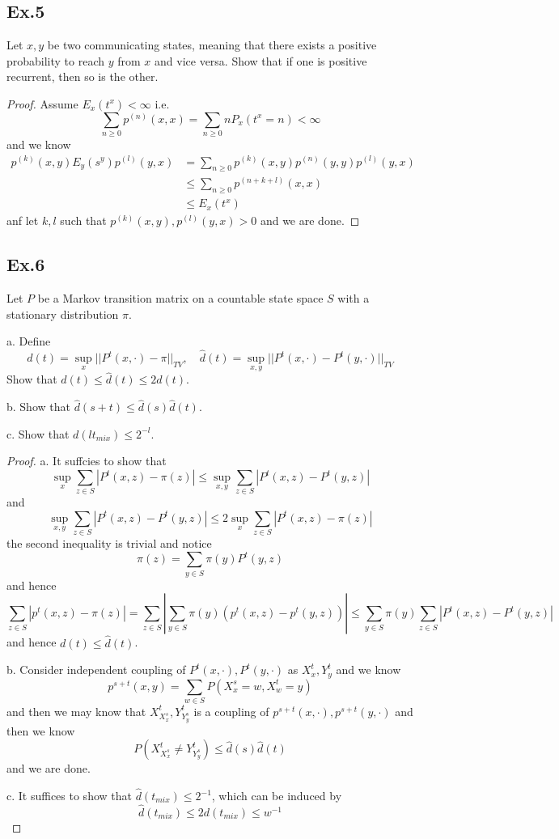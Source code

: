 \documentclass[lang=en,11pt,a4paper,citestyle =authoryear]{elegantpaper}
\begin{document}
\subsection*{Ex.5} 
Let $x,y$ be two communicating states, meaning that there exists a positive probability to reach $y$ from $x$ and vice versa. Show that if one is positive recurrent, then so is the other.
\begin{proof}
    Assume $E_x(t^x) < \infty $ i.e.
    \[
    \sum\limits_{n\geq 0} p^{(n)}(x,x) = \sum\limits_{n\geq 0} nP_x(t^x = n) < \infty
    \]
    and we know
    \[
    \begin{aligned}
    p^{(k)}(x,y)E_y(s^y)p^{(l)}(y,x) &= \sum\limits_{n\geq 0}p^{(k)}(x,y)p^{(n)}(y,y)p^{(l)}(y,x)\\
    & \leq \sum\limits_{n\geq 0}p^{(n+k+l)}(x,x) \\
    & \leq E_x(t^x)
    \end{aligned}
    \]
    anf let $k,l$ such that $p^{(k)}(x,y),p^{(l)}(y,x) > 0$ and we are done.
\end{proof}

\subsection*{Ex.6} 
Let $P$ be a Markov transition matrix on a countable state space $S$ with a stationary distribution $\pi$.\par
a. Define
\[d(t) = \sup_x ||P^t(x,\cdot)-\pi||_{TV},\quad \hat{d}(t) = \sup_{x,y}||P^t(x,\cdot) - P^t(y,\cdot)||_{TV}\]
Show that $d(t) \leq \hat{d}(t) \leq 2d(t)$.\par
b. Show that $\hat{d}(s+t) \leq \hat{d}(s)\hat{d}(t)$.\par
c. Show that $d(lt_{mix}) \leq 2^{-l}$.
\begin{proof}
a. It suffcies to show that
\[
\sup_x\sum\limits_{z\in S}|P^t(x,z) - \pi(z)| \leq \sup_{x,y}\sum\limits_{z\in S}|P^t(x,z) - P^t(y,z)|
\]
and 
\[
\sup_{x,y}\sum\limits_{z\in S}|P^t(x,z) - P^t(y,z)| \leq 2\sup_{x}\sum\limits_{z\in S}|P^t(x,z) - \pi(z)|
\]
the second inequality is trivial and notice
\[
\pi(z) = \sum\limits_{y\in S}\pi(y)P^t(y,z)
\]
and hence
\[
\sum\limits_{z\in S}|p^t(x,z) - \pi(z)| = \sum\limits_{z\in S}|\sum\limits_{y\in S}\pi(y)(p^{t}(x,z)-p^t(y,z))| \leq \sum\limits_{y\in S}\pi(y)\sum\limits_{z\in S}|P^t(x,z) - P^t(y,z)|
\]
and hence $d(t) \leq \hat{d}(t)$.\par
b. Consider independent coupling of $P^t(x,\cdot), P^t(y,\cdot)$ as $X_x^t, Y_y^t$ and we know
\[
p^{s+t}(x,y) = \sum\limits_{w\in S}P(X_x^s = w, X_w^t = y)
\]
and then we may know that $X_{X_x^s}^t, Y_{Y_y^s}^t$ is a coupling of $p^{s+t}(x,\cdot), p^{s+t}(y,\cdot)$ and then we know
\[
P(X_{X_x^s}^t \neq Y_{Y_y^s}^t) \leq \hat{d}(s)\hat{d}(t)
\]
and we are done.\par
c. It suffices to show that $\hat{d}(t_{mix}) \leq 2^{-1}$, which can be induced by
\[\hat{d}(t_{mix}) \leq 2d(t_{mix}) \leq w^{-1}\]
\end{proof}
\end{document}
